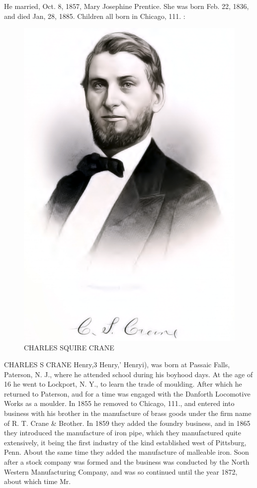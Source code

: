 \documentclass[oneside]{book}
\begin{document}
He married, Oct. 8, 1857, Mary Josephine Prentice. She was 
born Feb. 22, 1836, and died Jan, 28, 1885. Children all born 
in Chicago, 111. : 


\begin{figure}[htp]
	\centering
	\includegraphics[scale=0.75]{../white/whitecharlesSquireCraneWhite.png}
	\caption {CHARLES SQUIRE CRANE}
\end{figure}



CHARLES S CRANE Henry,3 Henry,' Henryi), was born at Passaic Falls, Paterson, 
N. J., where he attended school during his boyhood days. At 
the age of 16 he went to Lockport, N. Y., to learn the trade of 
moulding. After which he returned to Paterson, aud for a time 
was engaged with the Danforth Locomotive Works as a moulder. 
In 1855 he removed to Chicago, 111., and entered into business 
with his brother in the manufacture of brass goods under the firm 
name of R. T. Crane \& Brother. In 1859 they added the foundry 
business, and in 1865 they introduced the manufacture of iron 
pipe, which they manufactured quite extensively, it being the 
first industry of the kind established west of Pittsburg, Penn. 
About the same time they added the manufacture of malleable 
iron. Soon after a stock company was formed and the business 
was conducted by the North Western Manufacturing Company, 
and was so continued until the year 1872, about which time Mr. 
\end{document}
